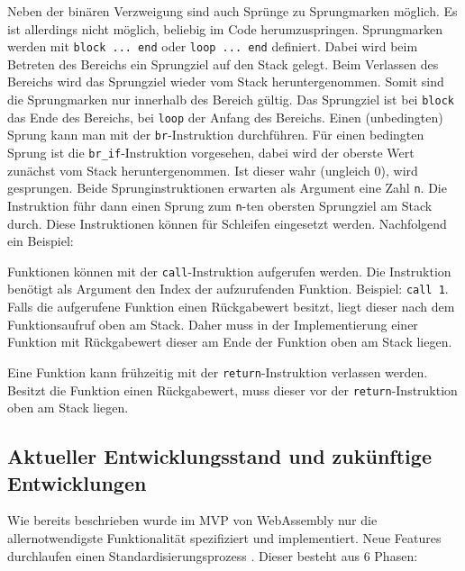 Neben der binären Verzweigung sind auch Sprünge zu Sprungmarken möglich. Es ist allerdings nicht möglich, beliebig im Code herumzuspringen. Sprungmarken werden mit \lstinline{block ... end} oder \lstinline{loop ... end} definiert. Dabei wird beim Betreten des Bereichs ein Sprungziel auf den Stack gelegt. Beim Verlassen des Bereichs wird das Sprungziel wieder vom Stack heruntergenommen. Somit sind die Sprungmarken nur innerhalb des Bereich gültig. Das Sprungziel ist bei \lstinline{block} das Ende des Bereichs, bei \lstinline{loop} der Anfang des Bereichs. Einen (unbedingten) Sprung kann man mit der \lstinline{br}-Instruktion durchführen. Für einen bedingten Sprung ist die \lstinline{br_if}-Instruktion vorgesehen, dabei wird der oberste Wert zunächst vom Stack heruntergenommen. Ist dieser wahr (ungleich 0), wird gesprungen. Beide Sprunginstruktionen erwarten als Argument eine Zahl \lstinline{n}. Die Instruktion führ dann einen Sprung zum \lstinline{n}-ten obersten Sprungziel am Stack durch. Diese Instruktionen können für Schleifen eingesetzt werden. Nachfolgend ein Beispiel: 



Funktionen können mit der \lstinline{call}-Instruktion aufgerufen werden. Die Instruktion benötigt als Argument den Index der aufzurufenden Funktion. Beispiel: \lstinline{call 1}. Falls die aufgerufene Funktion einen Rückgabewert besitzt, liegt dieser nach dem Funktionsaufruf oben am Stack. Daher muss in der Implementierung einer Funktion mit Rückgabewert dieser am Ende der Funktion oben am Stack liegen.

Eine Funktion kann frühzeitig mit der \lstinline{return}-Instruktion verlassen werden. Besitzt die Funktion einen Rückgabewert, muss dieser vor der \lstinline{return}-Instruktion oben am Stack liegen.

\subsection{Aktueller Entwicklungsstand und zukünftige Entwicklungen}
Wie bereits beschrieben wurde im MVP von WebAssembly nur die allernotwendigste Funktionalität spezifiziert und implementiert. Neue Features durchlaufen einen Standardisierungsprozess \cite{WebAssemblyW3CProcess}. Dieser besteht aus 6 Phasen:


